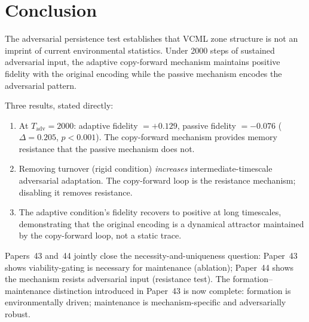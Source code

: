 \documentclass[11pt]{article}
\begin{document}
\section{Conclusion}

The adversarial persistence test establishes that VCML zone structure is not an
imprint of current environmental statistics.
Under 2000 steps of sustained adversarial input, the adaptive copy-forward mechanism
maintains positive fidelity with the original encoding while the passive mechanism
encodes the adversarial pattern.

Three results, stated directly:
\begin{enumerate}[itemsep=2pt]
  \item At $T_\mathrm{adv}=2000$: adaptive fidelity $= +0.129$, passive fidelity $= -0.076$
    ($\Delta = 0.205$, $p < 0.001$). The copy-forward mechanism provides memory resistance
    that the passive mechanism does not.
  \item Removing turnover (rigid condition) \emph{increases} intermediate-timescale adversarial
    adaptation. The copy-forward loop is the resistance mechanism; disabling it removes resistance.
  \item The adaptive condition's fidelity recovers to positive at long timescales, demonstrating
    that the original encoding is a dynamical attractor maintained by the copy-forward loop, not
    a static trace.
\end{enumerate}

Papers~43 and~44 jointly close the necessity-and-uniqueness question:
Paper~43 shows viability-gating is necessary for maintenance (ablation);
Paper~44 shows the mechanism resists adversarial input (resistance test).
The formation--maintenance distinction introduced in Paper~43 is now complete:
formation is environmentally driven; maintenance is mechanism-specific and
adversarially robust.
\end{document}
